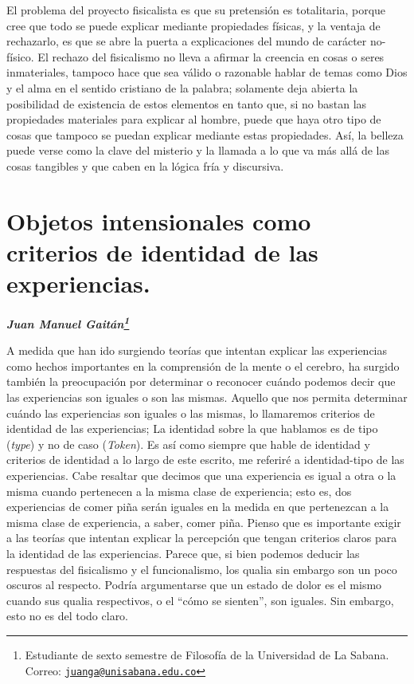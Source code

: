 \documentclass[]{book}
\newcommand{\autor}[1]{            %
  \begin{center}                   %
    \vspace*{-3.5em}               %
    \textbf{\textit{\large #1}}    %
    \vspace*{+4em}                 %
  \end{center}
}
\begin{document}
El problema del proyecto fisicalista es que su pretensión es
totalitaria, porque cree que todo se puede explicar mediante propiedades
físicas, y la ventaja de rechazarlo, es que se abre la puerta a
explicaciones del mundo de carácter no-físico. El rechazo del
fisicalismo no lleva a afirmar la creencia en cosas o seres
inmateriales, tampoco hace que sea válido o razonable hablar de temas
como Dios y el alma en el sentido cristiano de la palabra; solamente
deja abierta la posibilidad de existencia de estos elementos en tanto
que, si no bastan las propiedades materiales para explicar al hombre,
puede que haya otro tipo de cosas que tampoco se puedan explicar
mediante estas propiedades. Así, la belleza puede verse como la clave
del misterio y la llamada a lo que va más allá de las cosas tangibles y
que caben en la lógica fría y discursiva.

\chapter{\texorpdfstring{\textbf{Objetos intensionales como criterios de
identidad de las
experiencias.}}{Objetos intensionales como criterios de identidad de las experiencias.}}\label{objetos-intensionales-como-criterios-de-identidad-de-las-experiencias.}

\autor{Juan Manuel Gaitán\footnote{Estudiante de sexto semestre de
  Filosofía de la Universidad de La Sabana. Correo:
  \href{mailto:juanga@unisabana.edu.co}{\nolinkurl{juanga@unisabana.edu.co}}}}

A medida que han ido surgiendo teorías que intentan explicar las
experiencias como hechos importantes en la comprensión de la mente o el
cerebro, ha surgido también la preocupación por determinar o reconocer
cuándo podemos decir que las experiencias son iguales o son las mismas.
Aquello que nos permita determinar cuándo las experiencias son iguales o
las mismas, lo llamaremos criterios de identidad de las experiencias; La
identidad sobre la que hablamos es de tipo (\emph{type}) y no de caso
(\emph{Token}). Es así como siempre que hable de identidad y criterios
de identidad a lo largo de este escrito, me referiré a identidad-tipo de
las experiencias. Cabe resaltar que decimos que una experiencia es igual
a otra o la misma cuando pertenecen a la misma clase de experiencia;
esto es, dos experiencias de comer piña serán iguales en la medida en
que pertenezcan a la misma clase de experiencia, a saber, comer piña.
Pienso que es importante exigir a las teorías que intentan explicar la
percepción que tengan criterios claros para la identidad de las
experiencias. Parece que, si bien podemos deducir las respuestas del
fisicalismo y el funcionalismo, los qualia sin embargo son un poco
oscuros al respecto. Podría argumentarse que un estado de dolor es el
mismo cuando sus qualia respectivos, o el ``cómo se sienten'', son
iguales. Sin embargo, esto no es del todo claro.
\end{document}

